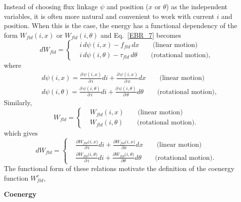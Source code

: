 \documentclass[11pt,a4paper,oneside]{book}
\numberwithin{equation}{section}
\theoremstyle{it}
\theoremstyle{definition}
\begin{document}
Instead of choosing flux linkage $\psi$ and position ($x$ or $\theta$) as the independent variables, it is often more natural and convenient to work with current $i$ and position. When this is the case, the energy has a functional dependency of the form $W_{fld}(i,x)$ or $W_{fld}(i,\theta)$ and Eq.~\eqref{EBR_7} becomes
\begin{equation}\label{EBR_12}
	dW_{fld}  = \left\{
	\begin{aligned}
		&i\,d\psi(i,x) - f_{fld}\,dx \qquad \text{(linear motion)} \\[8pt]
		&i\,d\psi(i,\theta) - \tau_{fld}\,d\theta \qquad \text{(rotational motion),} 
	\end{aligned}\right.
\end{equation} 
where
\begin{equation}\label{EBR_13}
	\begin{aligned}
		&d\psi(i,x) = \frac{\partial\,\psi(i,x)}{\partial\,i}di + \frac{\partial\,\psi(i,x)}{\partial\,x}dx \qquad \text{(linear motion)} \\[8pt]
		&d\psi(i,\theta) = \frac{\partial\,\psi(i,\theta)}{\partial\,i}di + \frac{\partial\,\psi(i,\theta)}{\partial\,\theta}d\theta \qquad \text{(rotational motion),} 
	\end{aligned}
\end{equation} 
Similarly, 
\begin{equation*}
	W_{fld} = \left\{
	\begin{aligned}
		&W_{fld}(i,x) \qquad \text{(linear motion)} \\[8pt]
		&W_{fld}(i,\theta) \qquad \text{(rotational motion).} 
	\end{aligned}\right.
\end{equation*}
which gives
\begin{equation}\label{EBR_14}
	dW_{fld}  = \left\{
	\begin{aligned}
		&\frac{\partial W_{fld}\big(i,x\big)}{\partial\,i}di +  \frac{\partial W_{fld}\big(i,x\big)}{\partial x}dx \qquad \text{(linear motion)} \\[8pt]
		&\frac{\partial W_{fld}\big(i,\theta\big)}{\partial\,i}di +  \frac{\partial W_{fld}\big(i,\theta\big)}{\partial \theta}d\theta \qquad \text{(rotational motion).} 
	\end{aligned}\right.
\end{equation} 
The functional form of these relations motivate the definition of the coenergy function $W_{fld}^c$,
\begin{center}
	\textbf{Coenergy}
\end{center}
\end{document}
